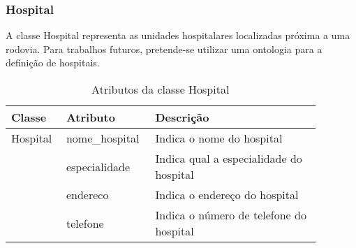 \subsubsection*{\textbf{Hospital}}

  A classe Hospital representa as unidades hospitalares localizadas próxima a uma rodovia. Para trabalhos futuros, pretende-se
  utilizar uma ontologia para a definição de hospitais.
  
    \begin{table*}[!h]
    \centering
    \begin{tabular}{p{0.15\linewidth}p{0.23\linewidth}p{0.5\linewidth}}
      \hline
      \textbf{Classe} & \textbf{Atributo} & \textbf{Descrição}\\
      \hline
	Hospital & nome\_hospital & Indica o nome do hospital\\
		 & especialidade & Indica qual a especialidade do hospital\\
		 & endereco & Indica o endereço do hospital\\
		 & telefone & Indica o número de telefone do hospital\\
      \hline
    \end{tabular}
    \caption{Atributos da classe Hospital}
    \label{tab:attr_hospital}
    \end{table*}
    
\vfill